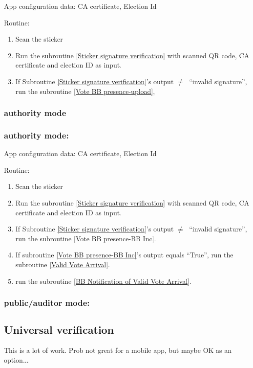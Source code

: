 \documentclass{article}
\begin{document}
App configuration data: CA certificate, Election Id


Routine:
\begin{enumerate}
    \item Scan the sticker
    \item Run the subroutine \ref{Sticker signature verification} with scanned QR code, CA certificate and election ID as input.
    \item If Subroutine \ref{Sticker signature verification}'s output $\neq\;$ ``invalid signature'', run the subroutine \ref{Vote BB presence-upload},
\end{enumerate}

\subsubsection{\remoteVotingCenter{} authority mode}

\subsubsection{\localVotingCenter{} authority mode:}
App configuration data: CA certificate, Election Id

Routine:
\begin{enumerate}
    \item Scan the sticker
    \item Run the subroutine \ref{Sticker signature verification} with scanned QR code, CA certificate and election ID as input.
    \item If Subroutine \ref{Sticker signature verification}'s output $\neq\;$ ``invalid signature'',  run the subroutine \ref{Vote BB presence-BB Inc}.
    \item If subroutine \ref{Vote BB presence-BB Inc}'s output equals ``True'', run the subroutine \ref{Valid Vote Arrival}.
    \item run the subroutine \ref{BB Notification of Valid Vote Arrival}.
\end{enumerate}
\subsubsection{\localVotingCenter{}  public/auditor mode:}

\subsection{Universal verification}
    This is a lot of work. Prob not great for a mobile app, but maybe OK as an option...
\end{document}
